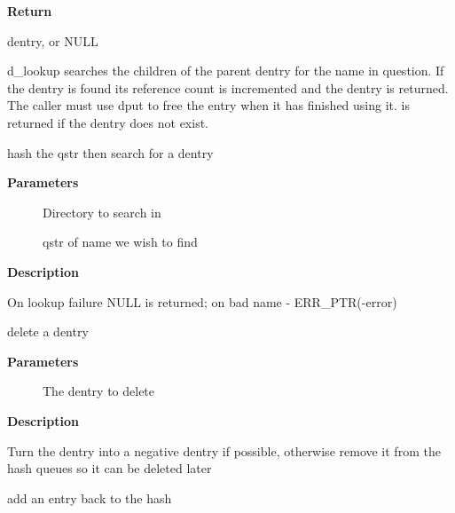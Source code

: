 \documentclass[a4paper,8pt,english]{sphinxmanual}
\begin{document}
\textbf{Return}

dentry, or NULL

d\_lookup searches the children of the parent dentry for the name in
question. If the dentry is found its reference count is incremented and the
dentry is returned. The caller must use dput to free the entry when it has
finished using it.  is returned if the dentry does not exist.

\begin{fulllineitems}
\label{filesystems/index:c.d_hash_and_lookup}
hash the qstr then search for a dentry

\end{fulllineitems}


\textbf{Parameters}
\begin{description}
\item[{}] \leavevmode
Directory to search in

\item[{}] \leavevmode
qstr of name we wish to find

\end{description}

\textbf{Description}

On lookup failure NULL is returned; on bad name - ERR\_PTR(-error)

\begin{fulllineitems}
\label{filesystems/index:c.d_delete}
delete a dentry

\end{fulllineitems}


\textbf{Parameters}
\begin{description}
\item[{}] \leavevmode
The dentry to delete

\end{description}

\textbf{Description}

Turn the dentry into a negative dentry if possible, otherwise
remove it from the hash queues so it can be deleted later

\begin{fulllineitems}
\label{filesystems/index:c.d_rehash}
add an entry back to the hash

\end{fulllineitems}
\end{document}
